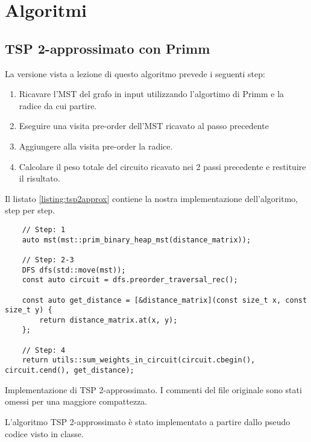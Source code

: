
\section{Algoritmi}
\label{cap:algorithms}

\subsection{TSP 2-approssimato con Primm}

La versione vista a lezione di questo algoritmo prevede i seguenti step:

\begin{enumerate}
    \item Ricavare l'MST del grafo in input utilizzando l'algortimo di Primm e la radice da cui partire.
    \item Eseguire una visita pre-order dell'MST ricavato al passo precedente
    \item Aggiungere alla visita pre-order la radice.
    \item Calcolare il peso totale del circuito ricavato nei 2 passi precedente e restituire il risultato.
\end{enumerate}

\noindent Il listato \ref{listing:tsp2approx} contiene la nostra implementazione dell'algoritmo, step per step.\\

\begin{listing}[!ht]
\begin{verbatim}
    // Step: 1
    auto mst(mst::prim_binary_heap_mst(distance_matrix));

    // Step: 2-3
    DFS dfs(std::move(mst));
    const auto circuit = dfs.preorder_traversal_rec();

    const auto get_distance = [&distance_matrix](const size_t x, const size_t y) {
        return distance_matrix.at(x, y);
    };

    // Step: 4
    return utils::sum_weights_in_circuit(circuit.cbegin(), circuit.cend(), get_distance);

\end{verbatim}
\caption{Implementazione di TSP 2-approssimato. I commenti del file originale sono stati omessi per una maggiore compattezza.}
\label{listing:tsp2approx}
\end{listing}

\noindent L'algoritmo TSP 2-approssimato è stato implementato a partire dallo pseudo codice visto in classe. \\

